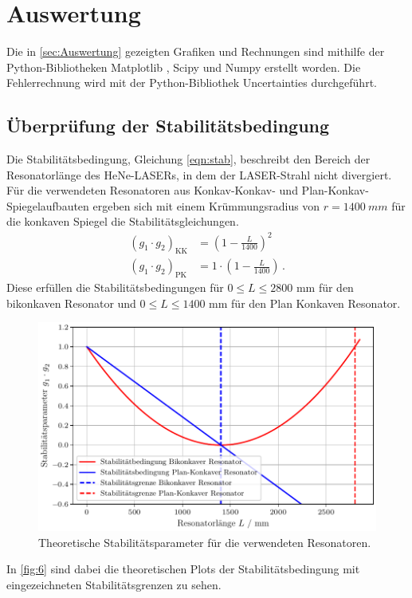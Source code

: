 \section{Auswertung}
\label{sec:Auswertung}
Die in \autoref{sec:Auswertung} gezeigten Grafiken und Rechnungen sind mithilfe der Python-Bibliotheken Matplotlib \cite{matplotlib}, Scipy \cite{scipy} und Numpy \cite{numpy}
erstellt worden. Die Fehlerrechnung wird mit der Python-Bibliothek Uncertainties \cite{uncertainties} durchgeführt.


\subsection{Überprüfung der Stabilitätsbedingung}
\label{sec:a1}
Die Stabilitätsbedingung, Gleichung \autoref{eqn:stab}, beschreibt den Bereich der Resonatorlänge des HeNe-LASERs, in dem der LASER-Strahl nicht divergiert.
Für die verwendeten Resonatoren aus Konkav-Konkav- und Plan-Konkav-Spiegelaufbauten ergeben sich mit einem Krümmungsradius von $r = \SI{1400}{mm}$ für die konkaven Spiegel die Stabilitätsgleichungen.
\begin{align}
  \left(g_1 \cdot g_2\right)_{\text{KK}} &= \left( 1 - \frac{L}{1400} \right)^2 \\
  \left(g_1 \cdot g_2\right)_{\text{PK}} &= 1 \cdot \left( 1 - \frac{L}{1400} \right) \, .
\end{align}
Diese erfüllen die Stabilitätsbedingungen für $0 \leq L \leq 2800 \, \, \mathrm{mm}$ für den bikonkaven Resonator und $0 \leq L \leq 1400 \, \, \mathrm{mm}$ für den Plan Konkaven Resonator.
\begin{figure}[H]
  \centering
  \includegraphics[width=0.7\linewidth]{plots/stab_theo.pdf}
  \caption{Theoretische Stabilitätsparameter für die verwendeten Resonatoren.}
  \label{fig:6}
\end{figure}
\noindent
In \autoref{fig:6} sind dabei die theoretischen Plots der Stabilitätsbedingung mit eingezeichneten Stabilitätsgrenzen zu sehen.
